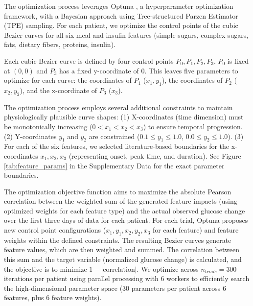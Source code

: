 The optimization process leverages Optuna \cite{akiba2019optuna}, a hyperparameter optimization framework, with a Bayesian approach using Tree-structured Parzen Estimator (TPE) sampling. For each patient, we optimize the control points of the cubic Bezier curves for all six meal and insulin features (simple sugars, complex sugars, fats, dietary fibers, proteins, insulin).

Each cubic Bezier curve is defined by four control points \(P_0, P_1, P_2, P_3\). \(P_0\) is fixed at \((0,0)\) and \(P_3\) has a fixed y-coordinate of 0. This leaves five parameters to optimize for each curve: the coordinates of \(P_1\) (\(x_1, y_1\)), the coordinates of \(P_2\) (\(x_2, y_2\)), and the x-coordinate of \(P_3\) (\(x_3\)).

The optimization process employs several additional constraints to maintain physiologically plausible curve shapes:
(1) X-coordinates (time dimension) must be monotonically increasing (\( 0 < x_1 < x_2 < x_3 \)) to ensure temporal progression. (2) Y-coordinates \(y_1\) and \(y_2\) are constrained (\(0.1 \le y_1 \le 1.0\), \(0.0 \le y_2 \le 1.0\)). (3) For each of the six features, we selected literature-based boundaries for the x-coordinates \(x_1, x_2, x_3\) (representing onset, peak time, and duration). See Figure \ref{tab:feature_params} in the Supplementary Data for the exact parameter boundaries.

The optimization objective function aims to maximize the absolute Pearson correlation between the weighted sum of the generated feature impacts (using optimized weights for each feature type) and the actual observed glucose change over the first three days of data for each patient. For each trial, Optuna proposes new control point configurations (\(x_1, y_1, x_2, y_2, x_3\) for each feature) and feature weights within the defined constraints. The resulting Bezier curves generate feature values, which are then weighted and summed. The correlation between this sum and the target variable (normalized glucose change) is calculated, and the objective is to minimize \(1 - |\text{correlation}|\). We optimize across \( n_{trials}=300 \) iterations per patient using parallel processing with 6 workers to efficiently search the high-dimensional parameter space (30 parameters per patient across 6 features, plus 6 feature weights). 